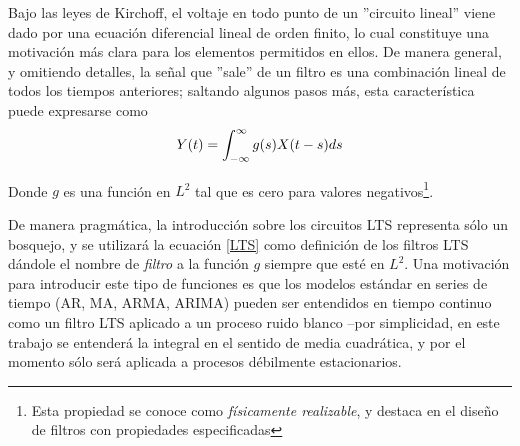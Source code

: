 Bajo las leyes de Kirchoff, el voltaje en todo punto de un ''circuito lineal'' viene dado
por una ecuaci\'on diferencial lineal de orden finito, lo cual constituye una motivaci\'on
m\'as clara para los elementos permitidos en ellos. De manera general, y omitiendo detalles,
la se\~nal que ''sale'' de un filtro es una combinaci\'on lineal de todos los tiempos anteriores;
saltando algunos pasos m\'as,
esta caracter\'istica puede expresarse como
\begin{equation}
Y(t) = \int_{-\infty}^{\infty} g(s) X(t-s) ds
\label{LTS}
\end{equation}

Donde $g$ es una funci\'on en $L^{2}$ tal que es cero para valores negativos\footnote{Esta
propiedad se conoce como \textit{f\'isicamente realizable}, y destaca en el dise\~no de 
filtros con propiedades especificadas}.

De manera pragm\'atica, la introducci\'on sobre los circuitos LTS representa s\'olo un bosquejo,
y se utilizar\'a la ecuaci\'on \ref{LTS} como definici\'on de los filtros LTS d\'andole
el nombre de \textit{filtro} a la funci\'on $g$ siempre que est\'e en $L^{2}$.
Una motivaci\'on para introducir este tipo de funciones es que los modelos est\'andar en 
series de tiempo (AR, MA, ARMA, ARIMA) pueden ser entendidos en tiempo continuo como un filtro
LTS aplicado a un proceso ruido blanco --por simplicidad, en este trabajo se entender\'a la integral
en el sentido de media cuadr\'atica, y por el momento s\'olo ser\'a aplicada a procesos 
d\'ebilmente estacionarios.


%

